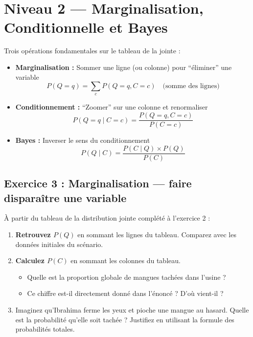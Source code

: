 \documentclass[11pt,a4paper]{article}
\begin{document}
\newpage

\section*{\textcolor{blue!70}{Niveau 2 --- Marginalisation, Conditionnelle et Bayes}}

\begin{methodebox}
Trois opérations fondamentales sur le tableau de la jointe :

\begin{itemize}[nosep]
    \item \textbf{Marginalisation :} Sommer une ligne (ou colonne) pour ``éliminer'' une variable
    $$P(Q = q) = \sum_{c} P(Q = q, C = c) \quad \text{(somme des lignes)}$$
    \item \textbf{Conditionnement :} ``Zoomer'' sur une colonne et renormaliser
    $$P(Q = q \mid C = c) = \frac{P(Q = q, C = c)}{P(C = c)}$$
    \item \textbf{Bayes :} Inverser le sens du conditionnement
    $$P(Q \mid C) = \frac{P(C \mid Q) \times P(Q)}{P(C)}$$
\end{itemize}
\end{methodebox}

\subsection*{Exercice 3 : Marginalisation --- faire disparaître une variable}

\begin{exercicebox}[Énoncé]
À partir du tableau de la distribution jointe complété à l'exercice 2 :

\begin{enumerate}
    \item \textbf{Retrouvez $P(Q)$} en sommant les lignes du tableau. Comparez avec les données initiales du scénario.
    \item \textbf{Calculez $P(C)$} en sommant les colonnes du tableau.
    \begin{itemize}
        \item Quelle est la proportion globale de mangues tachées dans l'usine ?
        \item Ce chiffre est-il directement donné dans l'énoncé ? D'où vient-il ?
    \end{itemize}
    \item Imaginez qu'Ibrahima ferme les yeux et pioche une mangue au hasard. Quelle est la probabilité qu'elle soit tachée ? Justifiez en utilisant la formule des probabilités totales.
\end{enumerate}
\end{exercicebox}
\end{document}
